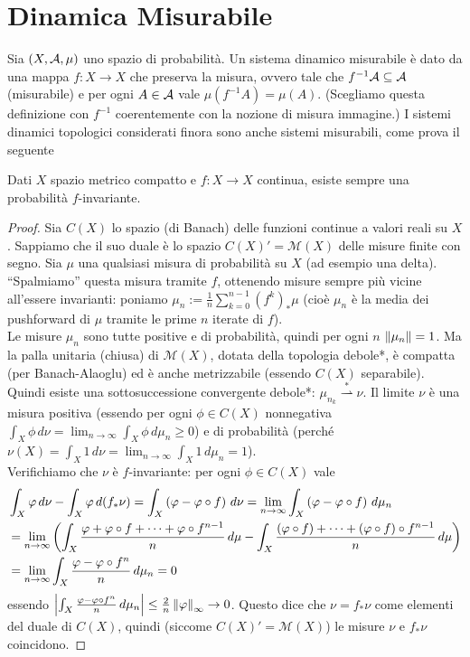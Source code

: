 \section{Dinamica Misurabile}

Sia $(X,\mathcal{A},\mu)$ uno spazio di probabilità. Un sistema dinamico misurabile è dato da una mappa $f:X\rightarrow X$ che preserva la misura, 
ovvero tale che $f^{-1}\mathcal{A}\subseteq \mathcal{A}$ (misurabile) e per ogni $A\in\mathcal{A}$ vale $\mu(f^{-1}A)=\mu(A)$. (Scegliamo questa definizione con $f^{-1}$ coerentemente con la nozione di misura immagine.)
I sistemi dinamici topologici considerati finora sono anche sistemi misurabili, come prova il seguente

\begin{teo} Dati $X$ spazio metrico compatto e $f:X\to X$ continua, esiste sempre una probabilità $f$-invariante.
\end{teo}

\begin{proof}Sia $C(X)$ lo spazio (di Banach) delle funzioni continue a valori reali su $X$. Sappiamo che il suo duale è lo spazio $C(X)'=\mathcal{M}(X)$ delle misure finite con segno.
Sia $\mu$ una qualsiasi misura di probabilità su $X$ (ad esempio una delta). ``Spalmiamo'' questa misura tramite $f$, ottenendo misure sempre più vicine all'essere invarianti:
poniamo $\mu_n:=\frac{1}{n}\sum_{k=0}^{n-1}(f^k)_*\mu$ (cioè $\mu_n$ è la media dei pushforward di $\mu$ tramite le prime $n$ iterate di $f$). \\
Le misure $\mu_n$ sono tutte positive e di probabilità, quindi per ogni $n$ $\left\|\mu_n\right\|=1$. Ma la palla unitaria (chiusa) di $\mathcal{M}(X)$, dotata
della topologia debole*, è compatta (per Banach-Alaoglu) ed è anche metrizzabile (essendo $C(X)$ separabile). Quindi esiste una sottosuccessione convergente
debole*: $\mu_{n_k}\overset{*}{\rightharpoonup}\nu$. Il limite $\nu$ è una misura positiva (essendo per ogni $\phi\in C(X)$ nonnegativa $\int_X \phi\,d\nu=
\lim_{n\to\infty}\int_X\phi\,d\mu_n\ge 0$) e di probabilità (perché $\nu(X)=\int_X 1\,d\nu=\lim_{n\to\infty}\int_X 1\,d\mu_n=1$). \\
Verifichiamo che $\nu$ è $f$-invariante: per ogni $\phi\in C(X)$ vale
\[ \begin{split}&\int_X \varphi\,d\nu-\int_X \varphi\,d(f_*\nu)=\int_X \left(\varphi-\varphi\circ f\right)\,d\nu=\lim_{n\to\infty}\int_X \left(\varphi-\varphi\circ f\right)\,d\mu_n \\
&=\lim_{n\to\infty}\left(\int_X \frac{\varphi+\varphi\circ f+\dots+\varphi\circ f^{n-1}}{n}\,d\mu-\int_X \frac{(\varphi\circ f)+\dots+(\varphi\circ f)\circ f^{n-1}}{n}\,d\mu\right) \\
&=\lim_{n\to\infty}\int_X\frac{\varphi-\varphi\circ f^n}{n}\,d\mu_n=0 \end{split} \]
essendo $\left|\int_X\frac{\varphi-\varphi\circ f^n}{n}\,d\mu_n\right|\le\frac{2}{n}\left\|\varphi\right\|_\infty\to 0$. Questo dice che $\nu=f_*\nu$ come elementi del duale di $C(X)$,
quindi (siccome $C(X)'=\mathcal{M}(X)$) le misure $\nu$ e $f_*\nu$ coincidono.
\end{proof}

